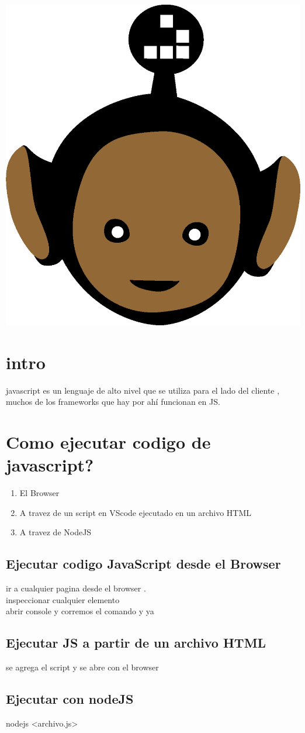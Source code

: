 \documentclass[10pt,a4paper]{article} %
\begin{document}
    \title{\rmfamily\normalfont{}}
    \author{}
    \date{\today} 
    
    \maketitle
     

    \includegraphics[width=0.1\linewidth]{negro_cara.png}
    \section{intro}
        javascript es un lenguaje de alto nivel que se utiliza para el lado del
        cliente , muchos de los frameworks que hay por ahí funcionan en JS. 
    \section{Como ejecutar codigo de javascript?}
        \begin{enumerate}
            \item {El Browser} 
            \item {A travez de un script en VScode ejecutado en un archivo HTML} 
            \item {A travez de NodeJS} 
        \end{enumerate}
        
        \subsection{Ejecutar codigo JavaScript desde el Browser}
            ir a cualquier pagina desde el browser . 
            \\ inspeccionar cualquier elemento 
            \\ abrir console y corremos el comando y ya
        \subsection{Ejecutar JS a partir de un archivo HTML}
           se agrega el script y se abre con el browser
        \subsection{Ejecutar con nodeJS}
            nodejs <archivo.js>
        
        
    







    
    \nocite{*}
    
    
\end{document}
